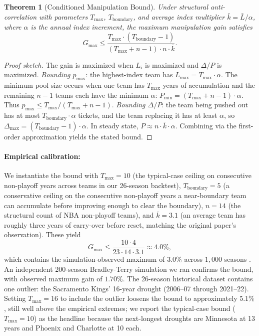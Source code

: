 \documentclass{article}
\newtheorem{theorem}{Theorem}
\begin{document}
\begin{theorem}[Conditioned Manipulation Bound]
\label{thm:bound}
Under structural anti-correlation with parameters $T_{\max}$, $T_{\text{boundary}}$, and average index multiplier $\bar{k} = \bar{L} / \alpha$, where $\alpha$ is the annual index increment, the maximum manipulation gain satisfies
\begin{equation*}
G_{\max} \leq \frac{T_{\max} \cdot (T_{\text{boundary}} - 1)}{(T_{\max} + n - 1) \cdot n \cdot \bar{k}}.
\end{equation*}
\end{theorem}

\begin{proof}[Proof sketch]
The gain is maximized when $L_i$ is maximized and $\Delta / P$ is maximized. \emph{Bounding $p_{\max}$}: the highest-index team has $L_{\max} = T_{\max} \cdot \alpha$. The minimum pool size occurs when one team has $T_{\max}$ years of accumulation and the remaining $n - 1$ teams each have the minimum $\alpha$: $P_{\min} = (T_{\max} + n - 1) \cdot \alpha$. Thus $p_{\max} \leq T_{\max} / (T_{\max} + n - 1)$. \emph{Bounding $\Delta / P$}: the team being pushed out has at most $T_{\text{boundary}} \cdot \alpha$ tickets, and the team replacing it has at least $\alpha$, so $\Delta_{\max} = (T_{\text{boundary}} - 1) \cdot \alpha$. In steady state, $P \approx n \cdot \bar{k} \cdot \alpha$. Combining via the first-order approximation yields the stated bound.
\end{proof}

\paragraph{Empirical calibration:} We instantiate the bound with $T_{\max} = 10$ (the typical-case ceiling on consecutive non-playoff years across teams in our 26-season backtest), $T_{\text{boundary}} = 5$ (a conservative ceiling on the consecutive non-playoff years a near-boundary team can accumulate before improving enough to clear the boundary), $n = 14$ (the structural count of NBA non-playoff teams), and $\bar{k} = 3.1$ (an average team has roughly three years of carry-over before reset, matching the original paper's observation). These yield
\begin{equation*}
G_{\max} \leq \frac{10 \cdot 4}{23 \cdot 14 \cdot 3.1} \approx 4.0\%,
\end{equation*}
which contains the simulation-observed maximum of $3.0\%$ across $1{,}000$ seasons \citep{highley2026cola}. An independent 200-season Bradley-Terry simulation we ran confirms the bound, with observed maximum gain of $1.70\%$. The 26-season historical dataset contains one outlier: the Sacramento Kings' 16-year drought (2006--07 through 2021--22). Setting $T_{\max} = 16$ to include the outlier loosens the bound to approximately $5.1\%$, still well above the empirical extremes; we report the typical-case bound ($T_{\max} = 10$) as the headline because the next-longest droughts are Minnesota at 13 years and Phoenix and Charlotte at 10 each.
\end{document}
